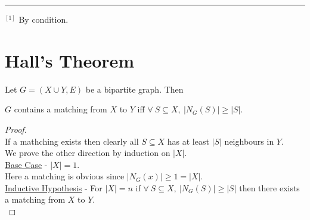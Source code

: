 \documentclass[11pt,a4paper]{article}
\begin{document}
\par\noindent\rule{\textwidth}{0.4pt}

$^{[1]}$ By condition.

\newpage
\section*{Hall's Theorem}
Let $G=(X\cup Y,E)$ be a bipartite graph. Then
\begin{center}
$G$ contains a matching from $X$ to $Y$ iff $\forall\ S\subseteq X,\ |N_G(S)|\geq|S|$.
\end{center}

\begin{proof}\hfill\\
If a mathching exists then clearly all $S\subseteq X$ has at least $|S|$ neighbours in $Y$.\\
We prove the other direction by induction on $|X|$.\\

\underline{Base Case} - $|X|=1$.\\
Here a matching is obvious since $|N_G(x)|\geq1=|X|$.\\

\underline{Inductive Hypothesis} - For $|X|=n$ if $\forall\ S\subseteq X,\ |N_G(S)|\geq|S|$ then there exists a matching from $X$ to $Y$.\\


\end{proof}
\end{document}
